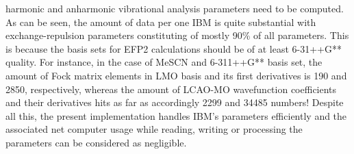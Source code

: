 \documentclass[a4paper,titlepage,twoside,fleqn,12pt]{book}
\begin{document}
\begin{refsection}
harmonic and anharmonic vibrational analysis parameters
need to be computed. As can be seen, the amount of data per one IBM is quite
substantial with exchange\hyp{}repulsion parameters constituting of mostly 90\% 
of all parameters. This is because the basis sets for EFP2 calculations
should be of at least 6-31++G** quality.
For instance, in the case of MeSCN and 6-311++G** basis set, 
the amount of Fock matrix elements in LMO basis
and its first derivatives
is 190 and 2850, respectively,
whereas the amount of LCAO-MO wavefunction coefficients and their derivatives
hits as far as accordingly 2299 and 34485 numbers!
Despite all this, the present implementation handles IBM's parameters
efficiently and the associated net computer usage while reading, writing
or processing the parameters
can be considered as negligible.


\end{refsection}
\end{document}
